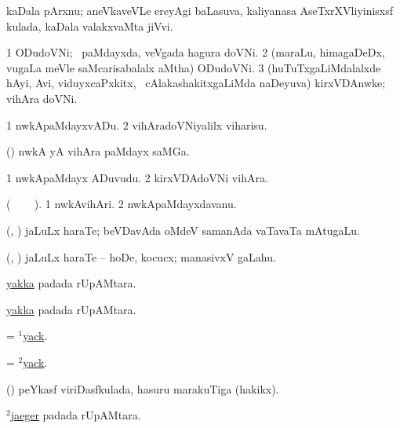   kaDala pArxnu; aneVkaveVLe ereyAgi baLasuva, kaliyanasa AseTxrXVliyinisxsf kulada, kaDala valakxvaMta jiVvi.
\eanum
\emng
\eentry

\bentry
{} 
\gl{\nA} 
\bmng
\bnum
\num{1} ODudoVNi; \kanmu\ paMdayxda, veVgada hagura  doVNi. 
\num{2} (maraLu, himagaDeDx, \mo vugaLa meVle saMcarisabalalx aMtha) ODudoVNi. 
\num{3} (huTuTxgaLiMdalalxde hAyi, Avi, viduyxcaPxkitx, \mo\ cAlakashakitxgaLiMda naDeyuva) kirxVDAnwke; vihAra doVNi.
\enum
\emng
\eentry

\bentry
{} 
\gl{\akirx} 
\bmng
\bnum
\num{1} nwkApaMdayxvADu. 
\num{2}  vihAradoVNiyalilx viharisu.
\enum
\emng
\eentry

\bentry 
{} 
\gl{\nA}
\bmng
(\kanmu) nwkA yA vihAra paMdayx saMGa.
\emng
\eentry

\bentry
{} 
\gl{\nA} 
\bmng
\bnum
\num{1} nwkApaMdayx ADuvudu. 
\num{2} kirxVDAdoVNi vihAra.
\enum
\emng
\eentry

\bentry
{} 
\gl{\nA} 
\bmng
(\bava\   \sitxrXV\   \bava\ ).
\bnum
\num{1} nwkAvihAri. 
\num{2} nwkApaMdayxdavanu.
\enum
\emng
\eentry

\bentry
{} 
\gl{\nA}  
\bmng
(\ashi, \hiV) jaLuLx haraTe; beVDavAda oMdeV samanAda vaTavaTa mAtugaLu.
\emng
\eentry

\bentry
{} 
\gl{\akirx} 
\bmng
(\ashi, \hiV) jaLuLx haraTe -- hoDe, kocucx; manasivxV gaLahu.
\emng
\eentry

\bentry
{} 
\gl{\nA}
\bmng
\hyperlink{yakka}{yakka} padada rUpAMtara.
\emng
\eentry

\bentry
{} 
\gl{\nA} 
\bmng
\hyperlink{yakka}{yakka} padada rUpAMtara.
\emng
\eentry

\bentry
{} 
\gl{\nA}
\bmng
= \hyperlink{yack(1)}{$^1$yack}.
\emng
\eentry

\bentry
{} 
\gl{\akirx} 
\bmng
= \hyperlink{yack(2)}{$^2$yack}.
\emng
\eentry

\bentry
{} 
\gl{\nA}
\bmng
(\pArxM) peYkasf viriDasfkulada, hasuru marakuTiga (hakikx).
\emng
\eentry

\bentry
{} 
\gl{\nA}
\bmng
\hyperref{kandict_j.pdf}{J}{jaeger(2)}{$^2$jaeger} padada rUpAMtara. 
\emng
\eentry

